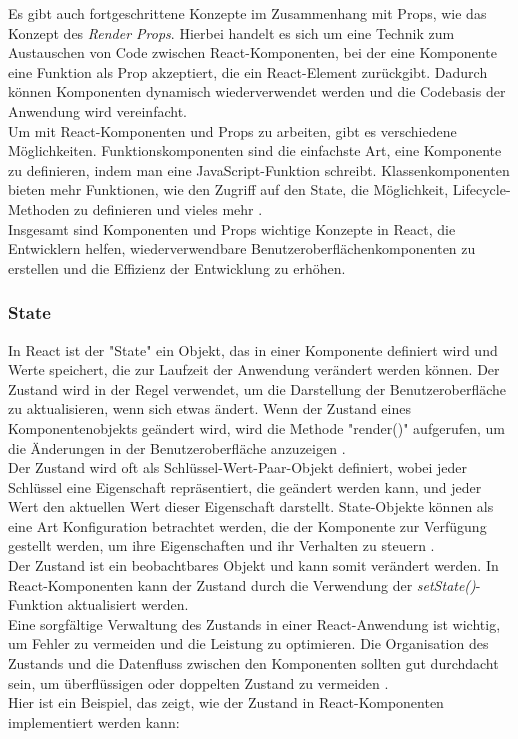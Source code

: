 Es gibt auch fortgeschrittene Konzepte im Zusammenhang mit Props, wie das Konzept des \emph{Render Props}. Hierbei handelt es sich um eine Technik zum Austauschen von Code zwischen React-Komponenten, bei der eine Komponente eine Funktion als Prop akzeptiert, die ein React-Element zurückgibt. Dadurch können Komponenten dynamisch wiederverwendet werden und die Codebasis der Anwendung wird vereinfacht\cite{ReactRenderProps}.\\
Um mit React-Komponenten und Props zu arbeiten, gibt es verschiedene Möglichkeiten. Funktionskomponenten sind die einfachste Art, eine Komponente zu definieren, indem man eine JavaScript-Funktion schreibt. Klassenkomponenten bieten mehr Funktionen, wie den Zugriff auf den State, die Möglichkeit, Lifecycle-Methoden zu definieren und vieles mehr \cite{RunebookReactComponentsAndProps}.\\
Insgesamt sind Komponenten und Props wichtige Konzepte in React, die Entwicklern helfen, wiederverwendbare Benutzeroberflächenkomponenten zu erstellen und die Effizienz der Entwicklung zu erhöhen.\\
\subsubsection{State}

In React ist der "State" ein Objekt, das in einer Komponente definiert wird und Werte speichert, die zur Laufzeit der Anwendung verändert werden können. Der Zustand wird in der Regel verwendet, um die Darstellung der Benutzeroberfläche zu aktualisieren, wenn sich etwas ändert. Wenn der Zustand eines Komponentenobjekts geändert wird, wird die Methode "render()" aufgerufen, um die Änderungen in der Benutzeroberfläche anzuzeigen \cite{W3SchoolsReactState}.\\

Der Zustand wird oft als Schlüssel-Wert-Paar-Objekt definiert, wobei jeder Schlüssel eine Eigenschaft repräsentiert, die geändert werden kann, und jeder Wert den aktuellen Wert dieser Eigenschaft darstellt. State-Objekte können als eine Art Konfiguration betrachtet werden, die der Komponente zur Verfügung gestellt werden, um ihre Eigenschaften und ihr Verhalten zu steuern \cite{FreeCodeCampStateInReact}.\\
Der Zustand ist ein beobachtbares Objekt und kann somit verändert werden. In React-Komponenten kann der Zustand durch die Verwendung der \emph{setState()}-Funktion aktualisiert werden.\\
Eine sorgfältige Verwaltung des Zustands in einer React-Anwendung ist wichtig, um Fehler zu vermeiden und die Leistung zu optimieren. Die Organisation des Zustands und die Datenfluss zwischen den Komponenten sollten gut durchdacht sein, um überflüssigen oder doppelten Zustand zu vermeiden \cite{ReactManagingState}.\\
Hier ist ein Beispiel, das zeigt, wie der Zustand in React-Komponenten implementiert werden kann:

